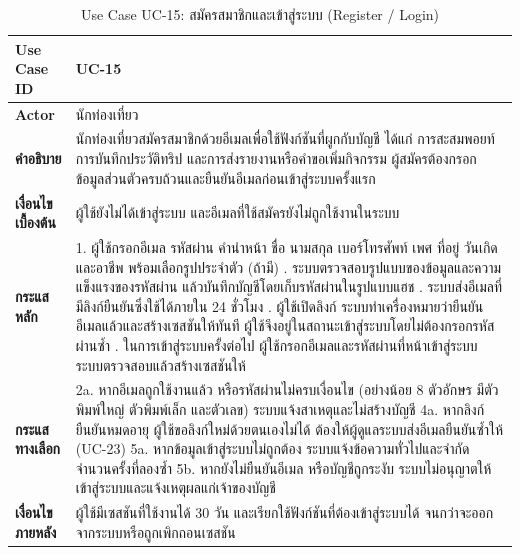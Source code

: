 \begin{table}[H]
\centering
\caption{Use Case UC-15: สมัครสมาชิกและเข้าสู่ระบบ (Register / Login)}
\label{tab:uc15}
\begin{tabular}{|p{3.2cm}|p{10cm}|}
\hline
\textbf{Use Case ID} & UC-15 \\ \hline
\textbf{Actor} & นักท่องเที่ยว \\ \hline
\textbf{คำอธิบาย} & นักท่องเที่ยวสมัครสมาชิกด้วยอีเมลเพื่อใช้ฟังก์ชันที่ผูกกับบัญชี ได้แก่ การสะสมพอยท์ การบันทึกประวัติทริป และการส่งรายงานหรือคำขอเพิ่มกิจกรรม ผู้สมัครต้องกรอกข้อมูลส่วนตัวครบถ้วนและยืนยันอีเมลก่อนเข้าสู่ระบบครั้งแรก \\ \hline
\textbf{เงื่อนไขเบื้องต้น} & ผู้ใช้ยังไม่ได้เข้าสู่ระบบ และอีเมลที่ใช้สมัครยังไม่ถูกใช้งานในระบบ \\ \hline
\textbf{กระแสหลัก} & 1. ผู้ใช้กรอกอีเมล รหัสผ่าน คำนำหน้า ชื่อ นามสกุล เบอร์โทรศัพท์ เพศ ที่อยู่ วันเกิด และอาชีพ พร้อมเลือกรูปประจำตัว (ถ้ามี) \newline 2. ระบบตรวจสอบรูปแบบของข้อมูลและความแข็งแรงของรหัสผ่าน แล้วบันทึกบัญชีโดยเก็บรหัสผ่านในรูปแบบแฮช \newline 3. ระบบส่งอีเมลที่มีลิงก์ยืนยันซึ่งใช้ได้ภายใน 24 ชั่วโมง \newline 4. ผู้ใช้เปิดลิงก์ ระบบทำเครื่องหมายว่ายืนยันอีเมลแล้วและสร้างเซสชันให้ทันที ผู้ใช้จึงอยู่ในสถานะเข้าสู่ระบบโดยไม่ต้องกรอกรหัสผ่านซ้ำ \newline 5. ในการเข้าสู่ระบบครั้งต่อไป ผู้ใช้กรอกอีเมลและรหัสผ่านที่หน้าเข้าสู่ระบบ ระบบตรวจสอบแล้วสร้างเซสชันให้ \\ \hline
\textbf{กระแสทางเลือก} & 2a. หากอีเมลถูกใช้งานแล้ว หรือรหัสผ่านไม่ครบเงื่อนไข (อย่างน้อย 8 ตัวอักษร มีตัวพิมพ์ใหญ่ ตัวพิมพ์เล็ก และตัวเลข) ระบบแจ้งสาเหตุและไม่สร้างบัญชี \newline 4a. หากลิงก์ยืนยันหมดอายุ ผู้ใช้ขอลิงก์ใหม่ด้วยตนเองไม่ได้ ต้องให้ผู้ดูแลระบบส่งอีเมลยืนยันซ้ำให้ (UC-23) \newline 5a. หากข้อมูลเข้าสู่ระบบไม่ถูกต้อง ระบบแจ้งข้อความทั่วไปและจำกัดจำนวนครั้งที่ลองซ้ำ \newline 5b. หากยังไม่ยืนยันอีเมล หรือบัญชีถูกระงับ ระบบไม่อนุญาตให้เข้าสู่ระบบและแจ้งเหตุผลแก่เจ้าของบัญชี \\ \hline
\textbf{เงื่อนไขภายหลัง} & ผู้ใช้มีเซสชันที่ใช้งานได้ 30 วัน และเรียกใช้ฟังก์ชันที่ต้องเข้าสู่ระบบได้ จนกว่าจะออกจากระบบหรือถูกเพิกถอนเซสชัน \\
\hline
\end{tabular}
\end{table}

